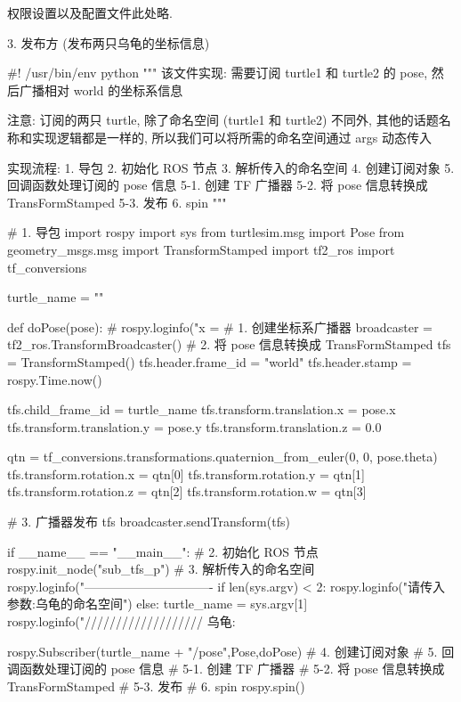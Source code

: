 \documentclass[openany, fontset=windowsold]{ctexbook}
\theoremstyle{kaiti}
\theoremstyle{normal}
\begin{document}
权限设置以及配置文件此处略.

3. 发布方 (发布两只乌龟的坐标信息)

\begin{python}
  #! /usr/bin/env python
  """  
      该文件实现: 需要订阅 turtle1 和 turtle2 的 pose, 然后广播相对 world 的坐标系信息

      注意: 订阅的两只 turtle, 除了命名空间 (turtle1 和 turtle2) 不同外,
            其他的话题名称和实现逻辑都是一样的, 
            所以我们可以将所需的命名空间通过 args 动态传入

      实现流程:
          1. 导包
          2. 初始化 ROS 节点
          3. 解析传入的命名空间
          4. 创建订阅对象
          5. 回调函数处理订阅的 pose 信息
              5-1. 创建 TF 广播器
              5-2. 将 pose 信息转换成 TransFormStamped
              5-3. 发布
          6. spin
  """

  # 1. 导包
  import rospy
  import sys
  from turtlesim.msg import Pose
  from geometry_msgs.msg import TransformStamped
  import tf2_ros
  import tf_conversions

  turtle_name = ""

  def doPose(pose):
      # rospy.loginfo("x = %
      # 1. 创建坐标系广播器
      broadcaster = tf2_ros.TransformBroadcaster()
      # 2. 将 pose 信息转换成 TransFormStamped
      tfs = TransformStamped()
      tfs.header.frame_id = "world"
      tfs.header.stamp = rospy.Time.now()

      tfs.child_frame_id = turtle_name
      tfs.transform.translation.x = pose.x
      tfs.transform.translation.y = pose.y
      tfs.transform.translation.z = 0.0

      qtn = tf_conversions.transformations.quaternion_from_euler(0, 0, pose.theta)
      tfs.transform.rotation.x = qtn[0]
      tfs.transform.rotation.y = qtn[1]
      tfs.transform.rotation.z = qtn[2]
      tfs.transform.rotation.w = qtn[3]

      # 3. 广播器发布 tfs
      broadcaster.sendTransform(tfs)

  if __name__ == "__main__":
      # 2. 初始化 ROS 节点
      rospy.init_node("sub_tfs_p")
      # 3. 解析传入的命名空间
      rospy.loginfo("-------------------------------%
      if len(sys.argv) < 2:
          rospy.loginfo("请传入参数:乌龟的命名空间")
      else:
          turtle_name = sys.argv[1]
      rospy.loginfo("/////////////////// 乌龟:%

      rospy.Subscriber(turtle_name + "/pose",Pose,doPose)
      #     4. 创建订阅对象
      #     5. 回调函数处理订阅的 pose 信息
      #         5-1. 创建 TF 广播器
      #         5-2. 将 pose 信息转换成 TransFormStamped
      #         5-3. 发布
      #     6. spin
      rospy.spin()
\end{python}
\end{document}
